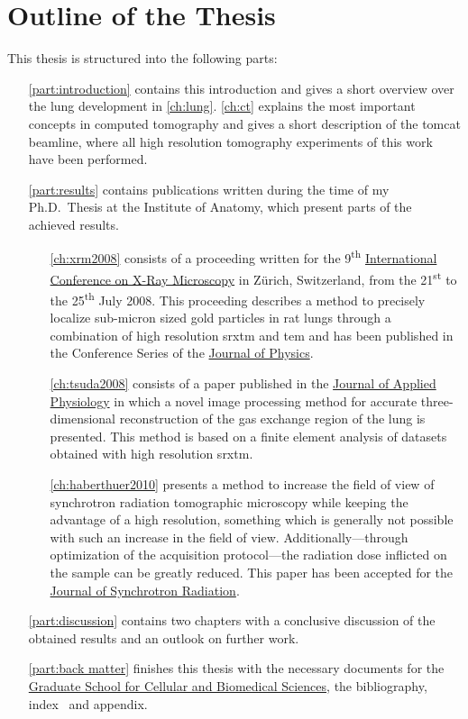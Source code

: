 \section{Outline of the Thesis}
This thesis is structured into the following parts:
\begin{itemize}
	\item [\autoref{part:introduction}] contains this introduction and gives a short overview over the lung development in \autoref{ch:lung}. \autoref{ch:ct} explains the most important concepts in computed tomography and gives a short description of the \ac{tomcat} beamline, where all high resolution tomography experiments of this work have been performed.
	\item [\autoref{part:results}] contains publications written during the time of my Ph.D.\ Thesis at the Institute of Anatomy, which present parts of the achieved results.
	\begin{itemize}
		\item [\autoref{ch:xrm2008}] consists of a proceeding written for the 9\textsuperscript{th} \href{http://xrm2008.web.psi.ch/}{International Conference on X-Ray Microscopy} in Zürich, Switzerland, from the 21\textsuperscript{st} to the 25\textsuperscript{th} July 2008. This proceeding describes a method to precisely localize sub-micron sized gold particles in rat lungs through a combination of high resolution \acl{srxtm} and \acl{tem} and has been published in the Conference Series of the \href{http://iopscience.iop.org/1742-6596/}{Journal of Physics}.
		
		\item [\autoref{ch:tsuda2008}] consists of a paper published in the \href{http://jap.physiology.org/}{Journal of Applied Physiology} in which a novel image processing method for accurate three-dimensional reconstruction of the gas exchange region of the lung is presented. This method is based on a finite element analysis of datasets obtained with high resolution \acl{srxtm}.

		\item [\autoref{ch:haberthuer2010}] presents a method to increase the field of view of synchrotron radiation tomographic microscopy while keeping the advantage of a high resolution, something which is generally not possible with such an increase in the field of view. Additionally---through optimization of the acquisition protocol---the radiation dose inflicted on the sample can be greatly reduced. This paper has been accepted for the \href{http://journals.iucr.org/s/}{Journal of Synchrotron Radiation}.
	\end{itemize}
	\item [\autoref{part:discussion}] contains two chapters with a conclusive discussion of the obtained results and an outlook on further work.
	\item [\autoref{part:back matter}] finishes this thesis with the necessary documents for the \href{http://www.gcb.unibe.ch}{Graduate School for Cellular and Biomedical Sciences}, the bibliography, index~ and appendix.
\end{itemize}